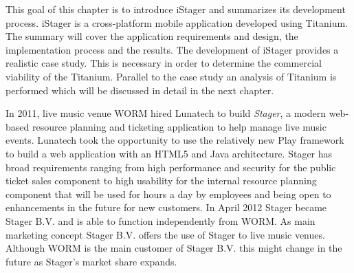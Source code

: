 This goal of this chapter is to introduce iStager and summarizes its development process. iStager is a cross-platform mobile application developed using Titanium. The summary will cover the application requirements and design, the implementation process and the results. 
The development of iStager provides a realistic case study. This is necessary in order to determine the commercial viability of the Titanium. Parallel to the case study an analysis of Titanium is performed which will be discussed in detail in the next chapter.






In 2011, live music venue WORM hired Lunatech to build \emph{Stager}, a modern web-based resource planning and ticketing application to help manage live music events. Lunatech took the opportunity to use the relatively new Play framework to build a web application with an HTML5 and Java architecture. Stager has broad requirements ranging from high performance and security for the public ticket sales component to high usability for the internal resource planning component that will be used for hours a day by employees and being open to enhancements in the future for new customers. \cite{Lunatech2011} In April 2012 Stager became Stager B.V. and is able to function independently from WORM. As main marketing concept Stager B.V. offers the use of Stager  to live music venues. Although WORM is the main customer of Stager B.V. this might change in the future as Stager's market share expands. 

